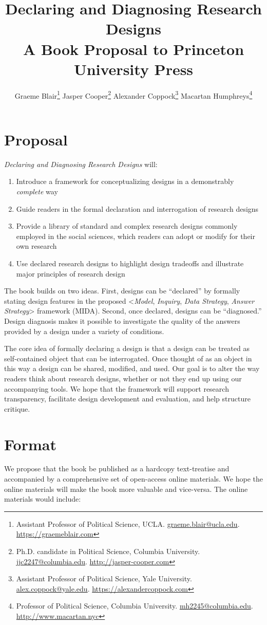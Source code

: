 \documentclass[11pt]{article}
\title{Declaring and Diagnosing Research Designs \\ {\normalsize A Book Proposal to Princeton University Press}}
\author{Graeme Blair\footnote{Assistant Professor of Political Science, UCLA. \href{mailto:graeme.blair@ucla.edu}{graeme.blair@ucla.edu}. \url{https://graemeblair.com}} \quad 
Jasper Cooper\footnote{Ph.D. candidate in Political Science, Columbia University. \href{mailto:jjc2247@columbia.edu}{jjc2247@columbia.edu}. \url{http://jasper-cooper.com}} \quad 
Alexander Coppock\footnote{Assistant Professor of Political Science, Yale University. \href{mailto:alex.coppock@yale.edu}{alex.coppock@yale.edu}. \url{https://alexandercoppock.com}} \quad 
\setcounter{footnote}{7}
Macartan Humphreys\footnote{Professor of Political Science, Columbia University. \href{mailto:mh2245@columbia.edu}{mh2245@columbia.edu}. \url{http://www.macartan.nyc}}   }
\begin{document}
\maketitle


\section{Proposal}

\noindent \textit{Declaring and Diagnosing Research Designs} will:
\begin{enumerate}
	\item Introduce a framework for conceptualizing designs in a demonstrably \textit{complete} way
	\item Guide readers in the formal declaration and interrogation of research designs
	\item Provide a library of standard and complex research designs commonly employed in the social sciences, which readers can adopt or modify for their own research
	\item Use declared research designs to highlight design tradeoffs and illustrate major principles of research design
\end{enumerate}

The book builds on two ideas. First, designs can be ``declared'' by formally stating design features in the proposed <\textit{Model}, \textit{Inquiry}, \textit{Data Strategy}, \textit{Answer Strategy}> framework (MIDA). Second, once declared, designs can be ``diagnosed.'' Design diagnosis makes it possible to investigate the quality of the answers provided by a design under a variety of conditions.   

The core idea of formally declaring a design is that a design can be treated as self-contained object that can be interrogated. Once thought of as an object in this way a design can be shared, modified, and used. Our goal is to alter the way readers think about research designs, whether or not they end up using our accompanying tools. We hope that the framework will support research transparency, facilitate design development and evaluation, and help structure critique. 

\section{Format}

We propose that the book be published as a hardcopy text-treatise and accompanied by a comprehensive set of open-access online materials. We hope the online materials will make the book more valuable and vice-versa. The online materials would include:
\end{document}
